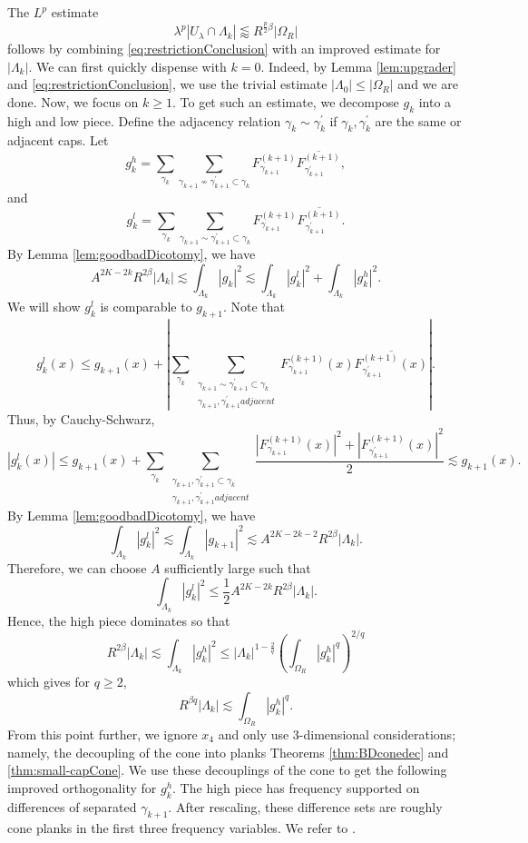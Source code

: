 \documentclass[12pt]{amsart}
\providecommand{\ol}{\overline}
\begin{document}
The $L^{p}$ estimate $$\lambda^p|U_\lambda\cap \Lambda_k|\lessapprox R^{\frac{p}{2}\beta}|\Omega_R|$$ follows by combining \eqref{eq:restrictionConclusion} with an improved estimate for $|\Lambda_k|$.
%
We can first quickly dispense with $k=0$. Indeed, by Lemma \ref{lem:upgrader} and \eqref{eq:restrictionConclusion}, we use the trivial estimate $|\Lambda_0|\le |\Omega_R|$ and we are done. Now, we focus on $k\ge 1$.
To get such an estimate, we decompose $g_k$ into a high and low piece. Define the adjacency relation $\gamma_{k}\sim \gamma_{k}^\prime$ if $\gamma_k, \gamma_k^\prime$ are the same or adjacent caps. Let $$g_k^h = \sum_{\gamma_k}\sum_{\gamma_{k+1}\not\sim \gamma_{k+1}^\prime\subset \gamma_k}F_{\gamma_{k+1}}^{(k+1)}\ol{F_{\gamma_{k+1}^\prime}^{(k+1)}},$$ and $$g_k^l = \sum_{\gamma_k}\sum_{\gamma_{k+1}\sim \gamma_{k+1}^\prime\subset \gamma_k}F_{\gamma_{k+1}}^{(k+1)}\ol{F_{\gamma_{k+1}^\prime}^{(k+1)}}.$$
%
By Lemma \ref{lem:goodbadDicotomy}, we have $$A^{2K-2k}R^{2\beta}|\Lambda_k|\lesssim \int_{\Lambda_k}|g_k|^2\lesssim \int_{\Lambda_k}|g_k^l|^2+\int_{\Lambda_k}|g_k^h|^2.$$  We will show $g_k^l$ is comparable to $g_{k+1}$.
%
    Note that $$g_k^l(x) \le  g_{k+1}(x)+ \left|\sum_{\gamma_k}\sum_{\substack{\gamma_{k+1}\sim \gamma_{k+1}^\prime \subset \gamma_k\\ \gamma_{k+1}, \gamma_{k+1}^\prime adjacent}}F^{(k+1)}_{\gamma_{k+1}}(x)\ol{F^{(k+1)}_{\gamma_{k+1}^\prime}(x)}\right|.$$ Thus, by Cauchy-Schwarz, $$|g_k^l(x)|\le g_{k+1}(x)+\sum_{\gamma_k}\sum_{\substack{\gamma_{k+1}, \gamma_{k+1}^\prime \subset \gamma_k\\ \gamma_{k+1}, \gamma_{k+1}^\prime adjacent}}\frac{|F^{(k+1)}_{\gamma_{k+1}}(x)|^2+|F^{(k+1)}_{\gamma_{k+1}^\prime}(x)|^2}{2}\lesssim g_{k+1}(x).$$
%
By Lemma \ref{lem:goodbadDicotomy}, we have $$\int_{\Lambda_k}|g_k^{l}|^2 \lesssim \int_{\Lambda_k}|g_{k+1}|^2\lesssim A^{2K-2k-2}R^{2\beta}|\Lambda_k|.$$
%
Therefore, we can choose $A$ sufficiently large such that $$\int_{\Lambda_k}|g_k^{l}|^2 \le \frac{1}{2}A^{2K-2k}R^{2\beta}|\Lambda_k|.$$ Hence, the high piece dominates so that $$R^{2\beta}|\Lambda_k|\lesssim \int_{\Lambda_k}|g_k^h|^2\le |\Lambda_k|^{1-\frac{2}{q}}\left(\int_{\Omega_R}|g_k^h|^q\right)^{2/q}$$ which gives for $q\ge 2$, $$R^{\beta q}|\Lambda_k|\lesssim \int_{\Omega_R}|g_k^h|^q.$$ From this point further, we ignore $x_4$ and only use $3$-dimensional considerations; namely, the decoupling of the cone into planks Theorems \ref{thm:BDconedec} and \ref{thm:small-capCone}. We use these decouplings of the cone to get the following improved orthogonality for $g_k^h$. The high piece has frequency supported on differences of separated $\gamma_{k+1}$. After rescaling, these difference sets are roughly cone planks in the first three frequency variables. We refer to \cite[Lemma 7, Lemma 8]{Guth_2024}.
\end{document}
